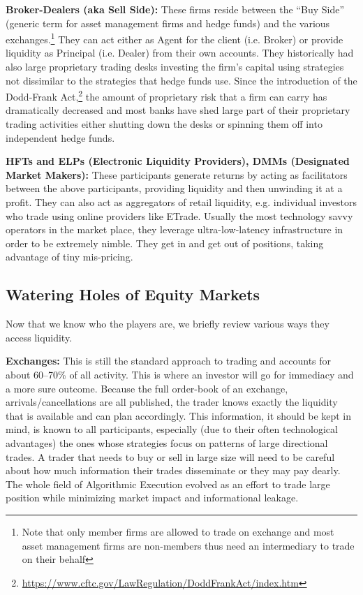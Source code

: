 \noindent\textbf{Broker-Dealers (aka Sell Side):} These firms reside between the ``Buy Side'' (generic term for asset management firms and hedge funds) and the various exchanges.\footnote{Note that only member firms are allowed to trade on exchange and most asset management firms are non-members thus need an intermediary to trade on their behalf} They can act either as Agent for the client (i.e. Broker) or provide liquidity as Principal (i.e. Dealer) from their own accounts. They historically had  also large proprietary trading desks investing the firm's capital using strategies not dissimilar to the strategies that hedge funds use. Since the introduction of the Dodd-Frank Act,\footnote{\url{https://www.cftc.gov/LawRegulation/DoddFrankAct/index.htm}} the amount of proprietary risk that a firm can carry has dramatically decreased and most banks have shed large part of their proprietary trading activities either shutting down the desks or spinning them off into independent hedge funds. \twomedskip


\noindent\textbf{HFTs and ELPs (Electronic Liquidity Providers), DMMs (Designated Market Makers):} These participants generate returns by acting as facilitators between the above participants, providing liquidity and then unwinding it at a profit. They can also act as aggregators of retail liquidity, e.g. individual investors who trade using online providers like ETrade. Usually the most technology savvy operators in the market place, they leverage ultra-low-latency infrastructure in order to be extremely nimble. They get in and get out of positions, taking advantage of tiny mis-pricing. 



\subsection{Watering Holes of Equity Markets}

Now that we know who the players are, we briefly review various ways they access liquidity. \twomedskip

\noindent\textbf{Exchanges:} This is still the standard approach to trading and accounts for about 60--70\% of all activity. This is where an investor will go for immediacy and a more sure outcome. Because the full order-book of an exchange, arrivals/cancellations are all published, the trader knows exactly the liquidity that is available and can plan accordingly. This information, it should be kept in mind, is known to all participants, especially (due to their often technological advantages) the ones whose strategies focus on patterns of large directional trades. A trader that needs to buy or sell in large size will need to be careful about how much information their trades disseminate or they may pay dearly. The whole field of Algorithmic Execution evolved as an effort to trade large position while minimizing market impact and informational leakage.


